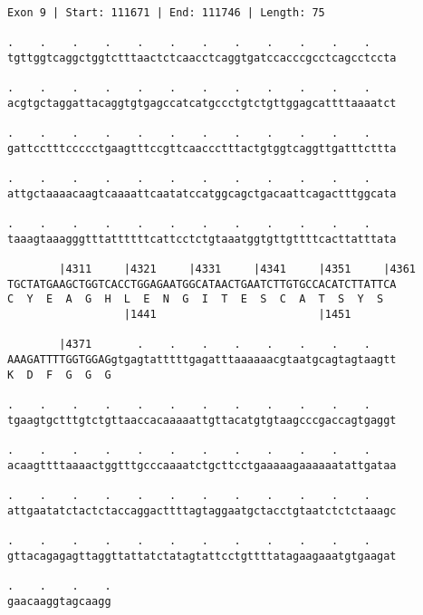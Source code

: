 \documentclass{article}
\begin{document}
\newpage
\begin{Verbatim}[fontfamily=courier]
Exon 9 | Start: 111671 | End: 111746 | Length: 75

.    .    .    .    .    .    .    .    .    .    .    .    
tgttggtcaggctggtctttaactctcaacctcaggtgatccacccgcctcagcctccta

.    .    .    .    .    .    .    .    .    .    .    .    
acgtgctaggattacaggtgtgagccatcatgccctgtctgttggagcattttaaaatct

.    .    .    .    .    .    .    .    .    .    .    .    
gattcctttccccctgaagtttccgttcaaccctttactgtggtcaggttgatttcttta

.    .    .    .    .    .    .    .    .    .    .    .    
attgctaaaacaagtcaaaattcaatatccatggcagctgacaattcagactttggcata

.    .    .    .    .    .    .    .    .    .    .    .    
taaagtaaagggtttattttttcattcctctgtaaatggtgttgttttcacttatttata

        |4311     |4321     |4331     |4341     |4351     |4361
TGCTATGAAGCTGGTCACCTGGAGAATGGCATAACTGAATCTTGTGCCACATCTTATTCA
C  Y  E  A  G  H  L  E  N  G  I  T  E  S  C  A  T  S  Y  S  
                  |1441                         |1451       

        |4371       .    .    .    .    .    .    .    .    
AAAGATTTTGGTGGAGgtgagtatttttgagatttaaaaaacgtaatgcagtagtaagtt
K  D  F  G  G  G                                            

.    .    .    .    .    .    .    .    .    .    .    .    
tgaagtgctttgtctgttaaccacaaaaattgttacatgtgtaagcccgaccagtgaggt

.    .    .    .    .    .    .    .    .    .    .    .    
acaagttttaaaactggtttgcccaaaatctgcttcctgaaaaagaaaaaatattgataa

.    .    .    .    .    .    .    .    .    .    .    .    
attgaatatctactctaccaggacttttagtaggaatgctacctgtaatctctctaaagc

.    .    .    .    .    .    .    .    .    .    .    .    
gttacagagagttaggttattatctatagtattcctgttttatagaagaaatgtgaagat

.    .    .    .
gaacaaggtagcaagg
\end{Verbatim}
\newpage
\end{document}

